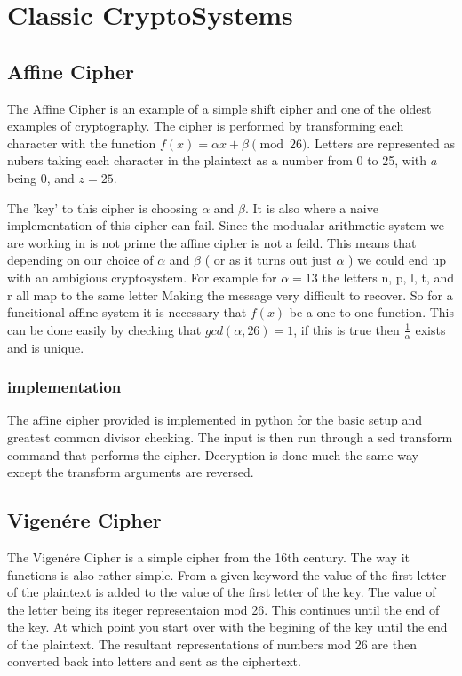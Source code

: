 
\chapter{Classic CryptoSystems}

\section{Affine Cipher}

The Affine Cipher is an example of a simple shift cipher and one of the oldest examples of cryptography.
The cipher is performed by transforming each character with the function $f(x) = \alpha x + \beta \pmod{26}$.
Letters are represented as nubers taking each character in the plaintext as a number from 0 to 25, with $a$ being 0, and $z= 25$.

The 'key' to this cipher is choosing $\alpha$ and $\beta$. It is also where a naive implementation of this cipher can fail.
Since the modualar arithmetic system we are working in is not prime the affine cipher is not a feild. 
This means that depending on our choice of $\alpha$ and $\beta$ ( or as it turns out just $\alpha$ ) we could end up with an ambigious cryptosystem.
For example for $\alpha = 13$ the letters n, p, l, t, and r all map to the same letter Making the message very difficult to recover.
So for a funcitional affine system it is necessary that $f(x)$ be a one-to-one function. 
This can be done easily by checking that $gcd(\alpha , 26) = 1$, if this is true then $\frac{1}{\alpha}$ exists and is unique.

\subsection{implementation}
The affine cipher provided is implemented in python for the basic setup and greatest common divisor checking.
The input is then run through a sed transform command that performs the cipher.
Decryption is done much the same way except the transform arguments are reversed.

\section{Vigen\'ere Cipher}

The Vigen\'ere Cipher is a simple cipher from the 16th century. 
The way it functions is also rather simple.
From a given keyword the value of the first letter of the plaintext is added to the value of the first letter of the key. 
The value of the letter being its iteger representaion mod 26.
This continues until the end of the key. At which point you start over with the begining of the key until the end of the plaintext.
The resultant representations of numbers mod 26 are then converted back into letters and sent as the ciphertext.

